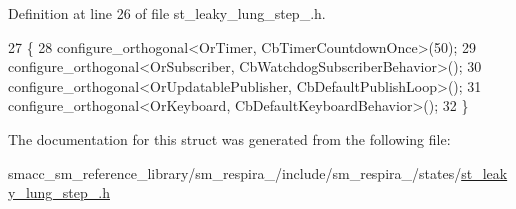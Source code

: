 Definition at line 26 of file st\+\_\+leaky\+\_\+lung\+\_\+step\+\_.\+h.


\begin{DoxyCode}
27     \{
28         configure\_orthogonal<OrTimer, CbTimerCountdownOnce>(50);
29         configure\_orthogonal<OrSubscriber, CbWatchdogSubscriberBehavior>();
30         configure\_orthogonal<OrUpdatablePublisher, CbDefaultPublishLoop>();
31         configure\_orthogonal<OrKeyboard, CbDefaultKeyboardBehavior>();
32     \}
\end{DoxyCode}


The documentation for this struct was generated from the following file\+:\begin{DoxyCompactItemize}
\item 
smacc\+\_\+sm\+\_\+reference\+\_\+library/sm\+\_\+respira\+\_/include/sm\+\_\+respira\+\_/states/\hyperlink{st__leaky__lung__step__3_8h}{st\+\_\+leaky\+\_\+lung\+\_\+step\+\_.\+h}\end{DoxyCompactItemize}

